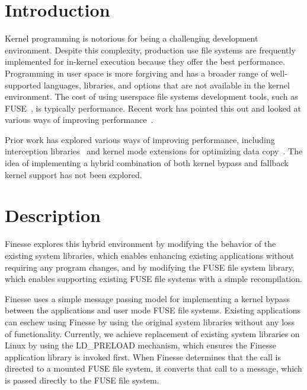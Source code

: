 \documentclass[sigplan,10pt,letter,plain]{acmart}
\begin{document}

\section{Introduction}

Kernel programming is notorious for being a challenging development environment.  Despite this complexity, production use file systems are frequently implemented for in-kernel execution because they offer the best performance.  Programming in user space is more forgiving and has a broader range of well-supported languages, libraries, and options that are not available in the kernel environment. The cost of using userspace file systems development tools, such as FUSE~\cite{fusegithub}, is typically performance.  Recent work has pointed this out and looked at various ways of improving performance~\cite{vangoor2017fuse,10.1145/3341301.3359637}.

Prior work has explored various ways of improving performance, including interception libraries~\cite{wright2012ldplfs} and kernel mode extensions for optimizing data copy~\cite{234870}.  The idea of implementing a hybrid combination of both kernel bypass and fallback kernel support has not been explored.

\section{Description}

Finesse explores this hybrid environment by modifying the behavior of the existing system libraries, which enables enhancing existing applications without requiring any program changes, and by modifying the FUSE file system library, which enables supporting existing FUSE file systems with a simple recompilation.

Finesse uses a simple message passing model for implementing a kernel bypass between the applications and user mode FUSE file systems.  Existing applications can eschew using Finesse by using the original system libraries without any loss of functionality.  Currently, we achieve replacement of existing system libraries on Linux by using the LD\_PRELOAD mechanism, which ensures the Finesse application library is invoked first.  When Finesse determines that the call is directed to a mounted FUSE file system, it converts that call to a message, which is passed directly to the FUSE file system.
\end{document}
